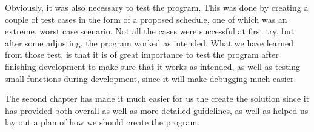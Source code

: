 Obviously, it was also necessary to test the program. This was done by creating a couple of test cases in the form of a proposed schedule, one of which was an extreme, worst case scenario. Not all the cases were successful at first try, but after some adjusting, the program worked as intended. What we have learned from those test, is that it is of great importance to test the program after finishing development to make sure that it works as intended, as well as testing small functions during development, since it will make debugging much easier.

The second chapter has made it much easier for us the create the solution since it has provided both overall as well as more detailed guidelines, as well as helped us lay out a plan of how we should create the program.